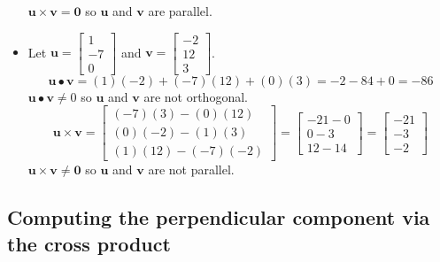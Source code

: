 \documentclass{article}
\begin{document}
\begin{itemize}
\(\mathbf{u} \times \mathbf{v} = \mathbf{0}\) so \(\mathbf{u}\) and \(\mathbf{v}\) are parallel.
\item Let \(\mathbf{u} = \begin{bmatrix} 1 \\ -7 \\ 0 \end{bmatrix}\) and \(\mathbf{v} = \begin{bmatrix} -2 \\ 12 \\ 3 \end{bmatrix}\). 
\[\mathbf{u} \bullet \mathbf{v} = (1)(-2) + (-7)(12) + (0)(3) = -2 - 84 + 0 = -86\]
\(\mathbf{u} \bullet \mathbf{v} \neq 0\) so \(\mathbf{u}\) and \(\mathbf{v}\) are not orthogonal. 
\[\mathbf{u} \times \mathbf{v} = \begin{bmatrix} (-7)(3) - (0)(12) \\ (0)(-2) - (1)(3) \\ (1)(12) - (-7)(-2) \end{bmatrix} = \begin{bmatrix} -21 - 0 \\ 0 - 3 \\ 12 - 14 \end{bmatrix} = \begin{bmatrix} -21 \\ -3 \\ -2 \end{bmatrix}\]
\(\mathbf{u} \times \mathbf{v} \neq \mathbf{0}\) so \(\mathbf{u}\) and \(\mathbf{v}\) are not parallel.
\end{itemize}



\subsection*{Computing the perpendicular component via the cross product}
\end{document}
